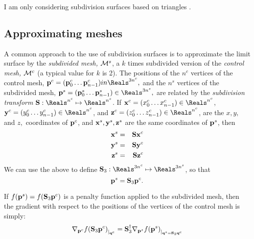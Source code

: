 I am only considering subdivision surfaces based on triangles
\cite{hoppe-et-al-94,hoppe-thesis-94}.

\subsection{Approximating meshes}
\label{sec:Approximating-meshes}

A common approach to the use of subdivision surfaces is
to approximate the limit surface by the {\it subdivided mesh,} ${\mathcal M}^s$,
a $k$ times subdivided version of the {\it control mesh,} ${\mathcal M}^c$
(a typical value for $k$ is 2).
The positions of the $n^c$ vertices of the control mesh,
$\p^c = (\p^c_0 \ldots \p^c_{n-1}) \\in \Reals^{3n^c},$
and the $n^s$ vertices of the subdivided mesh,
$\p^s = (\p^s_0 \ldots \p^s_{n-1}) \in \Reals^{3n^s},$
are related by the {\it subdivision transform}
$\S : \Reals^{n^c} \mapsto \Reals^{n^s}$.
If
$\x^c = (x^c_0 \ldots x^c_{n-1}) \in \Reals^{n^c}$,
$\y^c = (y^c_0 \ldots y^c_{n-1}) \in \Reals^{n^c}$,
and
$\z^c = (z^c_0 \ldots z^c_{n-1}) \in \Reals^{n^c}$,
are the $x, y,$ and $z,$ coordinates of ${\mathbf p}^c$,
and ${\mathbf x}^s, {\mathbf y}^s, {\mathbf z}^s$ are the same coordinates
of ${\mathbf p}^s$, then
\begin{eqnarray}
{\mathbf x}^s & = & {\mathbf S} {\mathbf x}^c
\\
{\mathbf y}^s & = & {\mathbf S} {\mathbf y}^c
\nonumber
\\
{\mathbf z}^s & = & {\mathbf S} {\mathbf z}^c
\nonumber
\end{eqnarray}
We can use the above to define $\S_3 : \Reals^{3n^c} \mapsto \Reals^{3n^s}$,
so that
\begin{equation}
{\mathbf p}^s = {\mathbf S}_3 {\mathbf p}^c.
\end{equation}


If $f({\mathbf p}^s) = f({\mathbf S}_3 {\mathbf p}^c)$ is a penalty function applied to the subdivided mesh,
then the gradient with respect to the positions of
the vertices of the control mesh is simply:
\begin{equation}
{\mathbf \nabla}_{{\mathbf p}^c}{{f({\mathbf S}_3 {\mathbf p}^c)}}_{\mid_{{\mathbf q}^c}} = {\mathbf S}_3^{\dagger} {\mathbf \nabla}_{{\mathbf p}^s}{{f({\mathbf p}^s)}}_{\mid_{{\mathbf q}^s = {\mathbf S}_3 {\mathbf q}^c}}
\end{equation}

